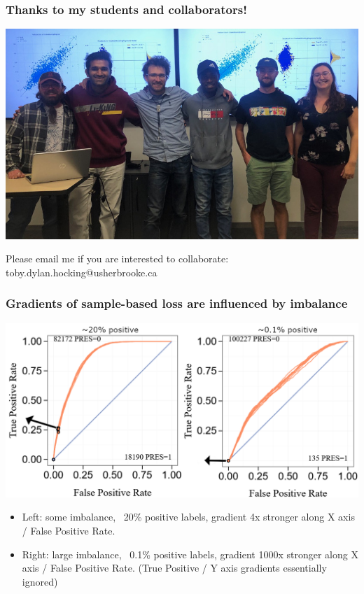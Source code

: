\documentclass[t]{beamer}
\begin{document}
\begin{frame}
  \frametitle{Thanks to my students and collaborators!}

  \includegraphics[width=\textwidth]{2022-10-14_ML_group_meeting}

  Please email me if you are interested to collaborate: toby.dylan.hocking@usherbrooke.ca

\end{frame}

\begin{frame}
  \frametitle{Gradients of sample-based loss are influenced by imbalance}
  \includegraphics[width=\textwidth]{roc-gradient-arrows}
  \begin{itemize}
  \item Left: some imbalance, ~20\% positive labels, gradient 4x
    stronger along X axis / False Positive Rate.
  \item Right: large imbalance, ~0.1\% positive labels, gradient 1000x
    stronger along X axis / False Positive Rate. (True Positive / Y
    axis gradients essentially ignored)
  \end{itemize}
\end{frame}
\end{document}
